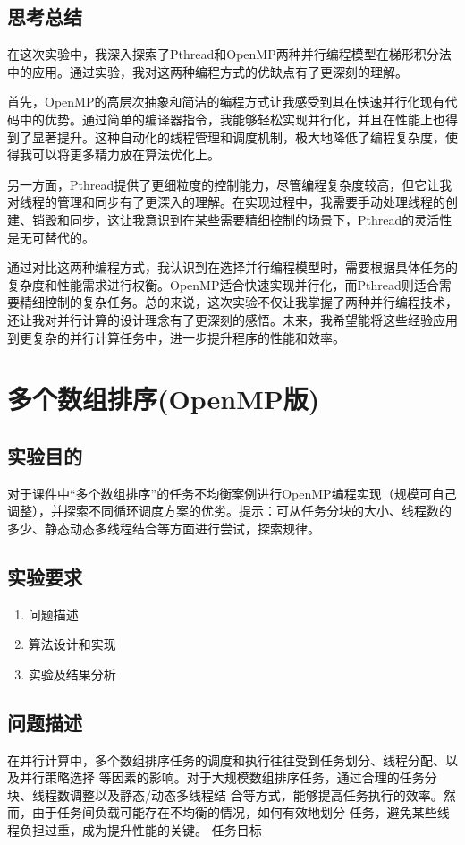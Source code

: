 \documentclass{nku}
\begin{document}
\subsection{思考总结}
在这次实验中，我深入探索了Pthread和OpenMP两种并行编程模型在梯形积分法中的应用。通过实验，我对这两种编程方式的优缺点有了更深刻的理解。

首先，OpenMP的高层次抽象和简洁的编程方式让我感受到其在快速并行化现有代码中的优势。通过简单的编译器指令，我能够轻松实现并行化，并且在性能上也得到了显著提升。这种自动化的线程管理和调度机制，极大地降低了编程复杂度，使得我可以将更多精力放在算法优化上。

另一方面，Pthread提供了更细粒度的控制能力，尽管编程复杂度较高，但它让我对线程的管理和同步有了更深入的理解。在实现过程中，我需要手动处理线程的创建、销毁和同步，这让我意识到在某些需要精细控制的场景下，Pthread的灵活性是无可替代的。

通过对比这两种编程方式，我认识到在选择并行编程模型时，需要根据具体任务的复杂度和性能需求进行权衡。OpenMP适合快速实现并行化，而Pthread则适合需要精细控制的复杂任务。总的来说，这次实验不仅让我掌握了两种并行编程技术，还让我对并行计算的设计理念有了更深刻的感悟。未来，我希望能将这些经验应用到更复杂的并行计算任务中，进一步提升程序的性能和效率。

\section{多个数组排序(OpenMP版)}
\subsection{实验目的}
对于课件中“多个数组排序”的任务不均衡案例进行OpenMP编程实现（规模可自己调整），并探索不同循环调度方案的优劣。提示：可从任务分块的大小、线程数的多少、静态动态多线程结合等方面进行尝试，探索规律。

\subsection{实验要求}
\begin{enumerate}
    \item 问题描述
    \item 算法设计和实现
    \item 实验及结果分析
\end{enumerate}

\subsection{问题描述}
在并行计算中，多个数组排序任务的调度和执行往往受到任务划分、线程分配、以及并行策略选择
等因素的影响。对于大规模数组排序任务，通过合理的任务分块、线程数调整以及静态/动态多线程结
合等方式，能够提高任务执行的效率。然而，由于任务间负载可能存在不均衡的情况，如何有效地划分
任务，避免某些线程负担过重，成为提升性能的关键。
任务目标
\end{document}
